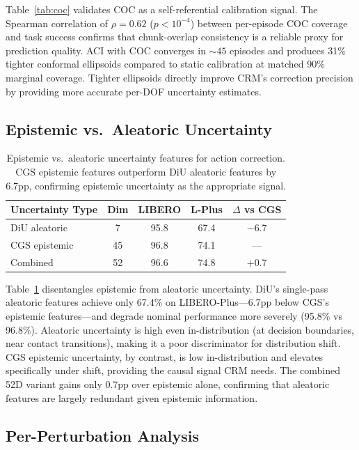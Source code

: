 \documentclass[10pt,letterpaper]{article}
\newcommand{\crm}{CRM}
\newcommand{\cgs}{CGS}
\newcommand{\aci}{ACI}
\begin{document}
Table~\ref{tab:coc} validates COC as a self-referential calibration signal.
The Spearman correlation of $\rho{=}0.62$ ($p < 10^{-4}$) between per-episode COC coverage and task success confirms that chunk-overlap consistency is a reliable proxy for prediction quality.
\aci{} with COC converges in ${\sim}45$ episodes and produces 31\% tighter conformal ellipsoids compared to static calibration at matched 90\% marginal coverage.
Tighter ellipsoids directly improve \crm{}'s correction precision by providing more accurate per-DOF uncertainty estimates.

\subsection{Epistemic vs.\ Aleatoric Uncertainty}
\label{sec:epistemic_aleatoric}

\begin{table}[t]
\centering
\caption{Epistemic vs.\ aleatoric uncertainty features for action correction. CGS epistemic features outperform DiU aleatoric features by 6.7pp, confirming epistemic uncertainty as the appropriate signal.}
\label{tab:uncertainty_type}
\begin{tabular}{lcccc}
\toprule
\textbf{Uncertainty Type} & \textbf{Dim} & \textbf{LIBERO} & \textbf{L-Plus} & \textbf{$\Delta$ vs CGS} \\
\midrule
DiU aleatoric & 7 & 95.8 & 67.4 & $-$6.7 \\
CGS epistemic & 45 & 96.8 & 74.1 & --- \\
Combined & 52 & 96.6 & 74.8 & $+$0.7 \\
\bottomrule
\end{tabular}
\end{table}

Table~\ref{tab:uncertainty_type} disentangles epistemic from aleatoric uncertainty.
DiU's single-pass aleatoric features achieve only 67.4\% on LIBERO-Plus---6.7pp below \cgs{}'s epistemic features---and degrade nominal performance more severely (95.8\% vs 96.8\%).
Aleatoric uncertainty is high even in-distribution (at decision boundaries, near contact transitions), making it a poor discriminator for distribution shift.
\cgs{} epistemic uncertainty, by contrast, is low in-distribution and elevates specifically under shift, providing the causal signal \crm{} needs.
The combined 52D variant gains only 0.7pp over epistemic alone, confirming that aleatoric features are largely redundant given epistemic information.

\subsection{Per-Perturbation Analysis}
\label{sec:per_perturbation}
\end{document}
